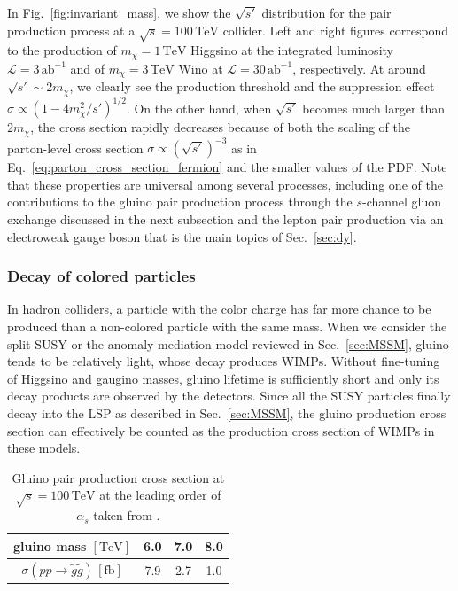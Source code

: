 \documentclass[12pt,twoside,book]{article}
\begin{document}
In Fig.~\ref{fig:invariant_mass}, we show the $\sqrt{s'}$ distribution for the pair production process at a $\sqrt{s} = 100\,\mathrm{TeV}$ collider.
Left and right figures correspond to the production of $m_\chi = 1\,\mathrm{TeV}$ Higgsino at the integrated luminosity $\mathcal{L} = 3\,\mathrm{ab}^{-1}$ and of $m_\chi = 3\,\mathrm{TeV}$ Wino at $\mathcal{L} = 30\,\mathrm{ab}^{-1}$, respectively.
At around $\sqrt{s'} \sim 2 m_\chi$, we clearly see the production threshold and the suppression effect $\sigma \propto (1-4 m_\chi^2 / s')^{1/2}$.
On the other hand, when $\sqrt{s'}$ becomes much larger than $2m_\chi$, the cross section rapidly decreases because of both the scaling of the parton-level cross section $\sigma \propto (\sqrt{s'})^{-3}$ as in Eq.~\eqref{eq:parton_cross_section_fermion} and the smaller values of the PDF.
Note that these properties are universal among several processes, including one of the contributions to the gluino pair production process through the $s$-channel gluon exchange discussed in the next subsection and the lepton pair production via an electroweak gauge boson that is the main topics of Sec.~\ref{sec:dy}.


\subsubsection*{Decay of colored particles}

In hadron colliders, a particle with the color charge has far more chance to be produced than a non-colored particle with the same mass.
When we consider the split SUSY or the anomaly mediation model reviewed in Sec.~\ref{sec:MSSM}, gluino tends to be relatively light, whose decay produces WIMPs.
Without fine-tuning of Higgsino and gaugino masses, gluino lifetime is sufficiently short and only its decay products are observed by the detectors.
Since all the SUSY particles finally decay into the LSP as described in Sec.~\ref{sec:MSSM}, the gluino production cross section can effectively be counted as the production cross section of WIMPs in these models.

\begin{table}[t]
  \centering
  \begin{tabular}{c|ccc}
    gluino mass $\mathrm{[TeV]}$ & 6.0 & 7.0 & 8.0 \\ \hline
    $\sigma(p p \to \tilde{g} \tilde{g})\, \mathrm{[fb]}$ & 7.9 & 2.7 & 1.0
  \end{tabular}
  \caption{
    Gluino pair production cross section at $\sqrt{s} = 100\,\mathrm{TeV}$ at the leading order of $\alpha_s$ taken from \cite{Asai:2019wst}.
  }
  \label{tab:gluino_pair}
\end{table}
\end{document}
